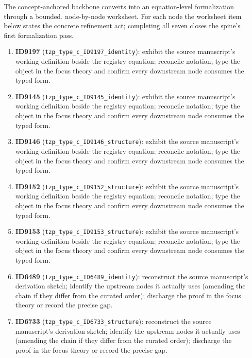 \documentclass[11pt]{article}
\theoremstyle{remark}
\begin{document}
The concept-anchored backbone converts into an equation-level formalization through a bounded, node-by-node worksheet. For each node the worksheet item below states the concrete refinement act; completing all seven closes the spine's first formalization pass.

\begin{enumerate}
\item \textbf{ID9197} (\texttt{tzp\_type\_c\_ID9197\_identity}): exhibit the source manuscript's working definition beside the registry equation; reconcile notation; type the object in the focus theory and confirm every downstream node consumes the typed form.
\item \textbf{ID9145} (\texttt{tzp\_type\_c\_ID9145\_identity}): exhibit the source manuscript's working definition beside the registry equation; reconcile notation; type the object in the focus theory and confirm every downstream node consumes the typed form.
\item \textbf{ID9146} (\texttt{tzp\_type\_c\_ID9146\_structure}): exhibit the source manuscript's working definition beside the registry equation; reconcile notation; type the object in the focus theory and confirm every downstream node consumes the typed form.
\item \textbf{ID9152} (\texttt{tzp\_type\_c\_ID9152\_structure}): exhibit the source manuscript's working definition beside the registry equation; reconcile notation; type the object in the focus theory and confirm every downstream node consumes the typed form.
\item \textbf{ID9153} (\texttt{tzp\_type\_c\_ID9153\_structure}): exhibit the source manuscript's working definition beside the registry equation; reconcile notation; type the object in the focus theory and confirm every downstream node consumes the typed form.
\item \textbf{ID6489} (\texttt{tzp\_type\_c\_ID6489\_identity}): reconstruct the source manuscript's derivation sketch; identify the upstream nodes it actually uses (amending the chain if they differ from the curated order); discharge the proof in the focus theory or record the precise gap.
\item \textbf{ID6733} (\texttt{tzp\_type\_c\_ID6733\_structure}): reconstruct the source manuscript's derivation sketch; identify the upstream nodes it actually uses (amending the chain if they differ from the curated order); discharge the proof in the focus theory or record the precise gap.
\end{enumerate}
\end{document}
